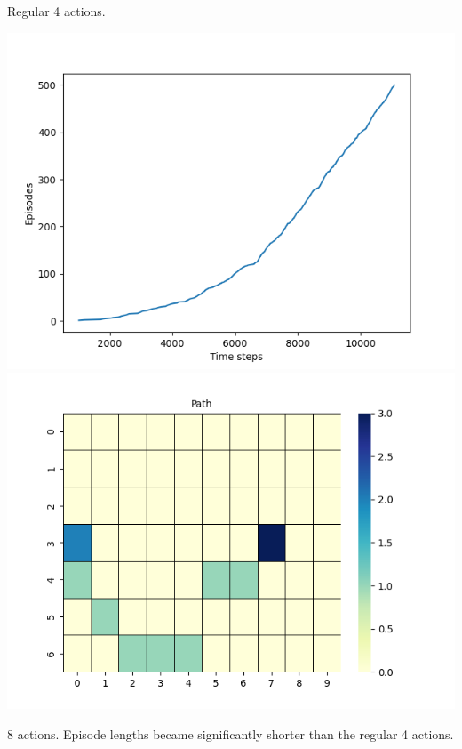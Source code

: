 \documentclass[11pt]{article}
\begin{document}
    Regular 4 actions.



    \includegraphics[scale=0.4]{figure_6_3_ex_6_9_a}
    \includegraphics[scale=0.4]{figure_6_3_ex_6_9_a_grid}

    8 actions.
    Episode lengths became significantly shorter than the regular 4 actions.
\end{document}
